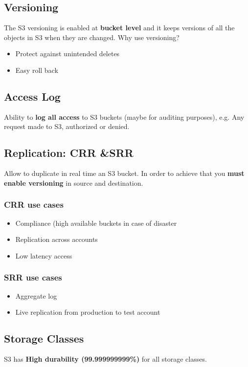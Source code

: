 \subsection{Versioning}\label{subsec:versioning}
The S3 versioning is enabled at \textbf{bucket level} and it keeps versions of all the objects in S3 when they are changed.
Why use versioning?
\begin{itemize}
	\item{Protect against unintended deletes}
	\item{Easy roll back}
\end{itemize}

\subsection{Access Log}\label{subsec:access-log}
Ability to \textbf{log all access} to S3 buckets (maybe for auditing purposes), e.g\@.
Any request made to S3, authorized or denied.

\subsection{Replication: CRR \&SRR}\label{subsec:replication-crr-srr}
Allow to duplicate in real time an S3 bucket.
In order to achieve that you \textbf{must enable versioning} in source and destination.
\subsubsection{CRR use cases}
\begin{itemize}
	\item{Compliance (high available buckets in case of disaster}
	\item{Replication across accounts}
	\item{Low latency access}
\end{itemize}
\subsubsection{SRR use cases}
\begin{itemize}
	\item{Aggregate log}
	\item{Live replication from production to test account}
\end{itemize}

\subsection{Storage Classes}\label{subsec:storage-classes}
S3 has \textbf{High durability (99.999999999\%)} for all storage classes.

